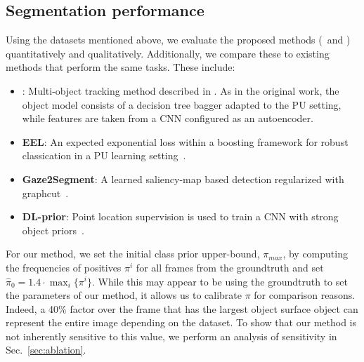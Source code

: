 \subsection{Segmentation performance}
\label{sec:exp_performance}
Using the datasets mentioned above, we evaluate the proposed methods (\SSnnPU~and \SSnnPUKSP) quantitatively and qualitatively. Additionally, we compare these to existing methods that perform the same tasks. These include:
\begin{itemize}
\item \KSPTrack: Multi-object tracking method described in \cite{lejeune18}. As in the original work, the object model consists of a decision tree bagger adapted to the PU setting, while features are taken from a CNN configured as an autoencoder.
\item \textbf{EEL}: An expected exponential loss within a boosting framework for robust classication in a PU learning setting~\cite{lejeune17}.
\item \textbf{Gaze2Segment}: A learned saliency-map based detection regularized with graphcut~\cite{khosravan16}.
\item \textbf{DL-prior}: Point location supervision is used to train a CNN with strong object priors~\cite{bearman16}.
\end{itemize}

For our method, we set the initial class prior upper-bound, $\pi_{max}$, by computing the frequencies of positives $\pi^{i}$ for all frames from the groundtruth and set $\hat \pi_{0}=1.4 \cdot \max_{i} \{ \pi^{i} \}$. While this may appear to be using the groundtruth to set the parameters of our method, it allows us to calibrate $\pi$ for comparison reasons. Indeed, a 40\% factor over the frame that has the largest object surface object can represent the entire image depending on the dataset. To show that our method is not inherently sensitive to this value, we perform an analysis of sensitivity in Sec.~\ref{sec:ablation}.


